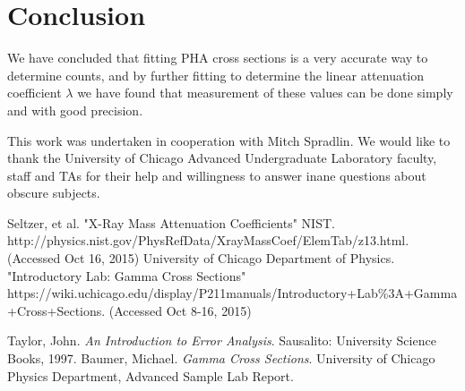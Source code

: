 \documentclass{article}
\begin{document}
\section{Conclusion}
	We have concluded that fitting PHA cross sections is a very accurate way to determine counts, and by further fitting to determine the linear attenuation coefficient $\lambda$ we have found that measurement of these values can be done simply and with good precision.\\

	\begin{flushleft}
	This work was undertaken in cooperation with Mitch Spradlin.  We would like to thank the University of Chicago Advanced Undergraduate Laboratory faculty, staff and TAs for their help and willingness to answer inane questions about obscure subjects.
	\end{flushleft}

\begin{thebibliography}{10}
		Seltzer, et al. "X-Ray Mass Attenuation Coefficients" NIST.\\
		http://physics.nist.gov/PhysRefData/XrayMassCoef/ElemTab/z13.html. (Accessed Oct 16, 2015)
		University of Chicago Department of Physics. "Introductory Lab: Gamma Cross Sections"\\
		https://wiki.uchicago.edu/display/P211manuals/Introductory+Lab\%3A+Gamma+Cross+Sections. (Accessed Oct 8-16, 2015)

		Taylor, John. \emph{An Introduction to Error Analysis}. Sausalito: University Science Books, 1997.
		Baumer, Michael. \emph{Gamma Cross Sections}.  University of Chicago Physics Department, Advanced Sample Lab Report.
\end{thebibliography}
\end{document}
